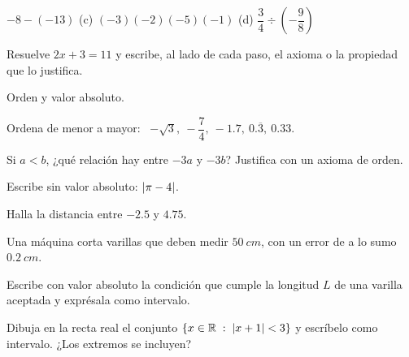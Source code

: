 \documentclass[11pt,a4paper]{article}
\newcommand{\per}[1]{\overline{#1}}
\begin{document}
\begin{ejercicios}
\begin{ejercicios}
  \item $-8-(-13)$ \quad (c) $(-3)(-2)(-5)(-1)$ \quad (d) $\dfrac34\div\left(-\dfrac98\right)$
  \end{ejercicios}
\item Resuelve $2x+3=11$ y escribe, al lado de cada paso, el axioma o la propiedad que lo justifica.
\item Orden y valor absoluto.
  \begin{ejercicios}
  \item Ordena de menor a mayor: \ $-\sqrt3,\ -\dfrac74,\ -1.7,\ 0.\per3,\ 0.33$.
  \item Si $a<b$, ¿qué relación hay entre $-3a$ y $-3b$? Justifica con un axioma de orden.
  \item Escribe sin valor absoluto: $\left\lvert \pi-4\right\rvert$.
  \item Halla la distancia entre $-2.5$ y $4.75$.
  \end{ejercicios}
\item Una máquina corta varillas que deben medir $\SI{50}{cm}$, con un error de a lo sumo $\SI{0.2}{cm}$.
  \begin{ejercicios}
  \item Escribe con valor absoluto la condición que cumple la longitud $L$ de una varilla aceptada y exprésala como intervalo.
  \item Dibuja en la recta real el conjunto $\{x\in\mathbb{R}\;:\;\left\lvert x+1\right\rvert<3\}$ y escríbelo como intervalo. ¿Los extremos se incluyen?
  \end{ejercicios}
\end{ejercicios}
\end{document}

